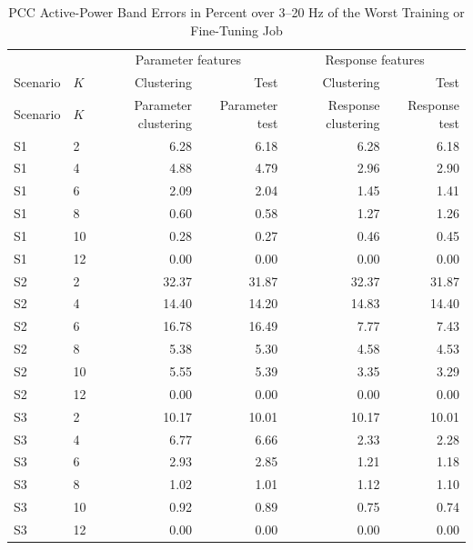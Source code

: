 \begin{longtable}{llrrrr}
\caption{PCC Active-Power Band Errors in Percent over 3--20 Hz of the Worst Training or Fine-Tuning Job}\label{tab:all-band}\\
\toprule
 & & \multicolumn{2}{c}{Parameter features} & \multicolumn{2}{c}{Response features}\\
Scenario & $K$ & Clustering & Test & Clustering & Test\\\midrule\endfirsthead
\toprule Scenario & $K$ & Parameter clustering & Parameter test & Response clustering & Response test\\\midrule\endhead
S1 & 2 & 6.28 & 6.18 & 6.28 & 6.18 \\
S1 & 4 & 4.88 & 4.79 & 2.96 & 2.90 \\
S1 & 6 & 2.09 & 2.04 & 1.45 & 1.41 \\
S1 & 8 & 0.60 & 0.58 & 1.27 & 1.26 \\
S1 & 10 & 0.28 & 0.27 & 0.46 & 0.45 \\
S1 & 12 & 0.00 & 0.00 & 0.00 & 0.00 \\
\midrule
S2 & 2 & 32.37 & 31.87 & 32.37 & 31.87 \\
S2 & 4 & 14.40 & 14.20 & 14.83 & 14.40 \\
S2 & 6 & 16.78 & 16.49 & 7.77 & 7.43 \\
S2 & 8 & 5.38 & 5.30 & 4.58 & 4.53 \\
S2 & 10 & 5.55 & 5.39 & 3.35 & 3.29 \\
S2 & 12 & 0.00 & 0.00 & 0.00 & 0.00 \\
\midrule
S3 & 2 & 10.17 & 10.01 & 10.17 & 10.01 \\
S3 & 4 & 6.77 & 6.66 & 2.33 & 2.28 \\
S3 & 6 & 2.93 & 2.85 & 1.21 & 1.18 \\
S3 & 8 & 1.02 & 1.01 & 1.12 & 1.10 \\
S3 & 10 & 0.92 & 0.89 & 0.75 & 0.74 \\
S3 & 12 & 0.00 & 0.00 & 0.00 & 0.00 \\
\bottomrule\end{longtable}
